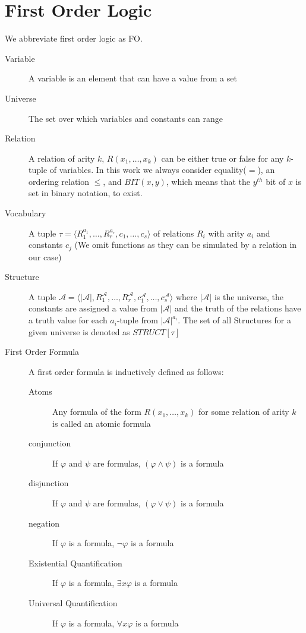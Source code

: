 \section{First Order Logic}\label{sec:first-order-logic}
We abbreviate first order logic as FO\@.
\begin{description}
    \item[Variable] A variable is an element that can have a value from a set
    \item[Universe] The set over which variables and constants can range
    \item[Relation] A relation of arity $k$, $R(x_1, \dots, x_k)$ can be either true or false for any $k$-tuple of variables.
    In this work we always consider equality($=$), an ordering relation $\leq$, and $BIT(x, y)$, which means that the $y^{th}$ bit of $x$ is set in binary notation, to exist.
    \item[Vocabulary] A tuple $\tau = \langle R_1^{a_1}, \dots, R_r^{a_r}, c_1, \dots, c_s \rangle$ of relations $R_i$ with arity $a_i$ and constants $c_j$ (We omit functions as they can be simulated by a relation in our case)
    \item[Structure] A tuple $\mathcal{A} = \langle |\mathcal{A}|, R_1^{\mathcal{A}}, \dots, R_r^{\mathcal{A}}, c_1^{\mathcal{A}}, \dots, c_s^{\mathcal{A}} \rangle$ where $|\mathcal{A}|$ is the universe, the constants are assigned a value from $|\mathcal{A}|$ and the truth of the relations have a truth value for each $a_i$-tuple from $|\mathcal{A}|^{a_i}$.
    The set of all Structures for a given universe is denoted as $STRUCT[\tau]$
    \item[First Order Formula] A first order formula is inductively defined as follows:
    \begin{description}
        \item[Atoms] Any formula of the form $R(x_1, \dots, x_k)$ for some relation of arity $k$ is called an atomic formula
        \item[conjunction] If $\varphi$ and $\psi$ are formulas, $(\varphi \land \psi)$ is a formula
        \item[disjunction] If $\varphi$ and $\psi$ are formulas, $(\varphi \lor \psi)$ is a formula
        \item[negation] If $\varphi$ is a formula, $\lnot \varphi$ is a formula
        \item[Existential Quantification] If $\varphi$ is a formula, $\exists x \varphi$ is a formula
        \item[Universal Quantification] If $\varphi$ is a formula, $\forall x \varphi$ is a formula

\end{description}
\end{description}
